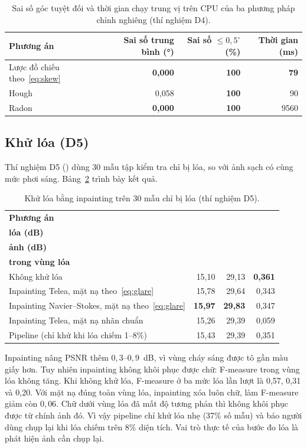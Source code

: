 \begin{table}[H]
\centering\small
\caption{Sai số góc tuyệt đối và thời gian chạy trung vị trên CPU của ba phương pháp chỉnh nghiêng (thí nghiệm D4).}\label{tab:D4}
\begin{tabular}{lrrr}
\toprule
\textbf{Phương án} & \textbf{Sai số trung bình (°)} & \textbf{Sai số $\le0{,}5^\circ$ (\%)} & \textbf{Thời gian (ms)} \\
\midrule
Lược đồ chiếu theo~\eqref{eq:skew} & \textbf{0,000} & \textbf{100} & \textbf{79} \\
Hough & 0,058 & \textbf{100} & 90 \\
Radon & \textbf{0,000} & \textbf{100} & \num{9560} \\
\bottomrule
\end{tabular}
\end{table}

\subsection{Khử lóa (D5)}
Thí nghiệm D5 () dùng 30 mẫu tập kiểm tra  chỉ bị lóa, so với ảnh sạch có cùng mức phơi sáng.
Bảng~\ref{tab:D5} trình bày kết quả.

\begin{table}[H]
\centering\small
\caption{Khử lóa bằng inpainting trên 30 mẫu chỉ bị lóa (thí nghiệm D5).}\label{tab:D5}
\begin{tabular}{lrrr}
\toprule
\textbf{Phương án} & \makecell{\textbf{PSNR vùng}\\\textbf{lóa (dB)}} & \makecell{\textbf{PSNR cả}\\\textbf{ảnh (dB)}} & \makecell{\textbf{F-measure chữ}\\\textbf{trong vùng lóa}} \\
\midrule
Không khử lóa & 15,10 & 29,13 & \textbf{0,361} \\
Inpainting Telea, mặt nạ theo~\eqref{eq:glare} & 15,78 & 29,64 & 0,343 \\
Inpainting Navier--Stokes, mặt nạ theo~\eqref{eq:glare} & \textbf{15,97} & \textbf{29,83} & 0,347 \\
Inpainting Telea, mặt nạ nhãn chuẩn & 15,26 & 29,39 & 0,059 \\
Pipeline (chỉ khử khi lóa chiếm 1--8\%) & 15,43 & 29,39 & 0,351 \\
\bottomrule
\end{tabular}
\end{table}

Inpainting nâng PSNR thêm $0{,}3$--$0{,}9$~dB, vì vùng cháy sáng được tô gần màu giấy hơn.
Tuy nhiên inpainting không khôi phục được chữ: F-measure trong vùng lóa không tăng.
Khi không khử lóa, F-measure ở ba mức lóa lần lượt là 0,57, 0,31 và 0,20.
Với mặt nạ đúng toàn vùng lóa, inpainting xóa luôn chữ, làm F-measure giảm còn $0{,}06$.
Chữ dưới vùng lóa đã mất độ tương phản thì không khôi phục được từ chính ảnh đó.
Vì vậy pipeline chỉ khử lóa nhẹ (37\% số mẫu) và báo người dùng chụp lại khi lóa chiếm trên 8\% diện tích.
Vai trò thực tế của bước đo lóa là phát hiện ảnh cần chụp lại.

